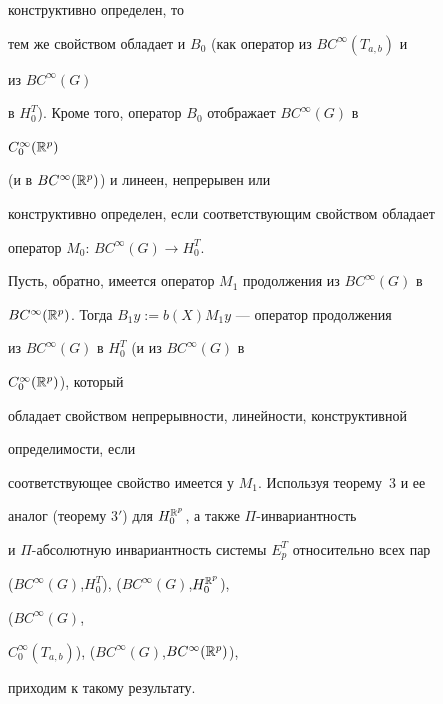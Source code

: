 конструктивно определен, то


тем же свойством обладает и $B_0$ (как оператор из $BC^\infty(T_{a,b})$ и


из $BC^\infty(G)$


в $H_0^T$). Кроме того, оператор $B_0$ отображает $BC^\infty(G)$ в


$C_0^\infty(\Bbb{R}^p)$


(и в $BC^\infty(\Bbb{R}^p)$) и линеен, непрерывен или


конструктивно определен, если соответствующим свойством обладает 


оператор $M_0$: $BC^\infty(G)\to H^T_0$.





Пусть, обратно, имеется оператор $M_1$ продолжения из $BC^\infty(G)$ в


$BC^\infty(\Bbb{R}^p)$. Тогда $B_1y:=b(X)M_1y$ --- оператор продолжения


из $BC^\infty(G)$ в $H_0^T$ (и из $BC^\infty(G)$ в


$C_0^\infty(\Bbb{R}^p)$), который


обладает свойством непрерывности, линейности, конструктивной


определимости, если


соответствующее свойство имеется у $M_1$. Используя теорему~3 и ее


аналог (теорему $3'$) для $H_0^{\Bbb{R}^p}$, а также $\Pi$-инвариантность


и $\Pi$-абсолютную инвариантность системы $E^T_p$ относительно всех пар


($BC^\infty(G)$,$H_0^T$), ($BC^\infty(G)$,$H_0^{\Bbb{R}^p}$),


($BC^\infty(G)$,


$C_0^\infty(T_{a,b})$), ($BC^\infty(G)$,$BC^\infty(\Bbb{R}^p)$),


приходим к такому результату.








